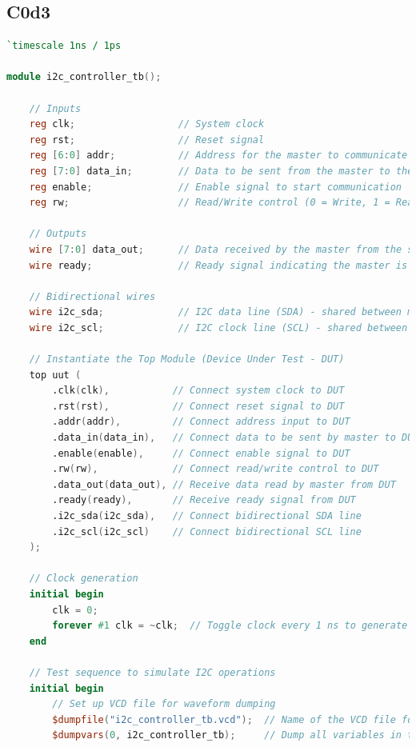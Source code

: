 \documentclass[a4paper,12pt]{report}
\begin{document}
\subsection{C0d3}
\begin{lstlisting}[language=Verilog, caption={Testbench Module for Top Module}, label=lst:testbench_module]
`timescale 1ns / 1ps

module i2c_controller_tb();

    // Inputs
    reg clk;                  // System clock
    reg rst;                  // Reset signal
    reg [6:0] addr;           // Address for the master to communicate with
    reg [7:0] data_in;        // Data to be sent from the master to the slave
    reg enable;               // Enable signal to start communication
    reg rw;                   // Read/Write control (0 = Write, 1 = Read)

    // Outputs
    wire [7:0] data_out;      // Data received by the master from the slave
    wire ready;               // Ready signal indicating the master is ready for a new operation

    // Bidirectional wires
    wire i2c_sda;             // I2C data line (SDA) - shared between master and slave
    wire i2c_scl;             // I2C clock line (SCL) - shared between master and slave

    // Instantiate the Top Module (Device Under Test - DUT)
    top uut (
        .clk(clk),           // Connect system clock to DUT
        .rst(rst),           // Connect reset signal to DUT
        .addr(addr),         // Connect address input to DUT
        .data_in(data_in),   // Connect data to be sent by master to DUT
        .enable(enable),     // Connect enable signal to DUT
        .rw(rw),             // Connect read/write control to DUT
        .data_out(data_out), // Receive data read by master from DUT
        .ready(ready),       // Receive ready signal from DUT
        .i2c_sda(i2c_sda),   // Connect bidirectional SDA line
        .i2c_scl(i2c_scl)    // Connect bidirectional SCL line
    );

    // Clock generation
    initial begin
        clk = 0;
        forever #1 clk = ~clk;  // Toggle clock every 1 ns to generate a 2 ns period clock (500 MHz)
    end

    // Test sequence to simulate I2C operations
    initial begin
        // Set up VCD file for waveform dumping
        $dumpfile("i2c_controller_tb.vcd");  // Name of the VCD file for waveform output
        $dumpvars(0, i2c_controller_tb);     // Dump all variables in this module for waveform analysis


\end{lstlisting}
\end{document}
